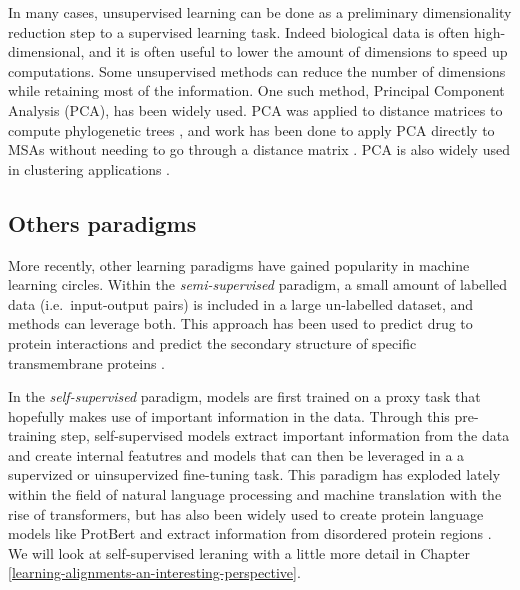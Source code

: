 \documentclass[
  11pt,
  twoside,
  BCOR=10mm,
  listof=totoc]{scrbook}
\begin{document}
In many cases, unsupervised learning can be done as a preliminary dimensionality reduction step to a supervised learning task. Indeed biological data is often high-dimensional, and it is often useful to lower the amount of dimensions to speed up computations. Some unsupervised methods can reduce the number of dimensions while retaining most of the information. One such method, Principal Component Analysis (PCA), has been widely used. PCA was applied to distance matrices to compute phylogenetic trees \autocite{haschkaMNHNTreeToolsToolboxTree2021}, and work has been done to apply PCA directly to MSAs without needing to go through a distance matrix \autocite{konishiPrincipalComponentAnalysis2019}. PCA is also widely used in clustering applications \autocite{ben-hurDetectingStableClusters2003,KmeansClusteringPrincipal,casariSequencespaceToolFamily1995,clampJalviewJavaAlignment2004}.

\hypertarget{others-paradigms}{%
\subsection{Others paradigms}\label{others-paradigms}}

More recently, other learning paradigms have gained popularity in machine learning circles. Within the \emph{semi-supervised} paradigm, a small amount of labelled data (i.e.~input-output pairs) is included in a large un-labelled dataset, and methods can leverage both. This approach has been used to predict drug to protein interactions \autocite{xiaSemisupervisedDrugproteinInteraction2010} and predict the secondary structure of specific transmembrane proteins \autocite{tamposisSemisupervisedLearningHidden2019}.

In the \emph{self-supervised} paradigm, models are first trained on a proxy task that hopefully makes use of important information in the data. Through this pre-training step, self-supervised models extract important information from the data and create internal featutres and models that can then be leveraged in a a supervized or uinsupervized fine-tuning task. This paradigm has exploded lately within the field of natural language processing and machine translation with the rise of transformers, but has also been widely used to create protein language models like ProtBert \autocite{elnaggarProtTransCrackingLanguage2021} and extract information from disordered protein regions \autocite{luDiscoveringMolecularFeatures2022}. We will look at self-supervised leraning with a little more detail in Chapter \ref{learning-alignments-an-interesting-perspective}.
\end{document}
